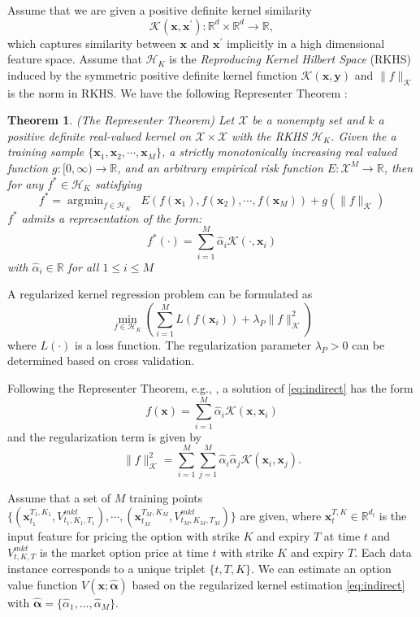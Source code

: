\documentclass[letterpaper,12pt,titlepage,oneside,final]{book}
\numberwithin{equation}{section}
\newtheorem{thm}{Theorem}[section]
\theoremstyle{definition}
\newcommand{\vx}{\mathbf{x}}
\newcommand{\HK}{\mathcal{H}_K}
\newcommand{\XS}{\mathcal{X}}
\newcommand{\Real}{\mathbb{R}}
\DeclareMathOperator*{\argmin}{\arg\!\min}
\newcommand{\valpha}{\pmb{\widehat{\alpha}}}
\begin{document}
Assume that we are given a positive definite kernel similarity
 $$
 \mathcal{K}(\vx, \vx^\prime) : \Real^{d} \times \Real^{d} \rightarrow  \Real,
 $$
 which captures  similarity between $\vx$ and $\vx^\prime$ implicitly in a high dimensional feature space.
 Assume that $\HK$ is the  \emph{Reproducing Kernel Hilbert Space} (RKHS) induced by the symmetric positive definite kernel function $ \mathcal{K}(\mathbf{x},\mathbf{y})$ and $\|f\|_{ \mathcal{K}}$ is the norm in RKHS.
 We have the following Representer Theorem \citep{wahba1990spline}:
\begin{thm}\label{pc:representer}
 (The Representer Theorem)
Let $\XS$ be a nonempty set and $k$ a positive definite real-valued kernel on $\XS \times \XS$ with the RKHS $\HK$.  Given the a training sample $
 \{\mathbf{x}_1, \mathbf{x}_2, \cdots, \mathbf{x}_M\} $, a strictly monotonically increasing real valued function $g:[0, \infty) \rightarrow \Real $,  and an arbitrary empirical risk function $E:\XS^M \rightarrow \Real $, then for any $f^* \in \HK$ satisfying
 \[
 f^*=\argmin_{f \in \HK} \;\;E\left(f(\mathbf{x}_1), f(\mathbf{x}_2), \cdots, f(\mathbf{x}_M)\right) + g( \|f\|_{\mathcal{K}})
 \]
 $f^*$ admits a representation of the form:
 \[
 f^*(\cdot)=\sum_{i=1}^M \widehat{\alpha}_i \mathcal{K}(\cdot,\mathbf{x}_i)
 \]
 with $\widehat{\alpha}_i \in \Real$  for all $1 \leq i \leq M$
\end{thm}

A regularized kernel regression problem can be formulated as
\begin{equation}
\min_{f \in \HK}\left(  \sum_{i=1}^M L(f(\vx_i))+\lambda_P \|f\|^2_{\mathcal{K}}\right)
\label{eq:indirect}
\end{equation}
where $L(\cdot)$ is a loss function.
The regularization parameter $\lambda_P>0$  can be determined based on cross validation.

Following the Representer Theorem,  e.g., \citep{wahba1990spline}, a solution of  \eqref{eq:indirect} has the form
\begin{equation}\label{kr1}
f(\mathbf{x})=\sum_{i=1}^M \widehat{\alpha}_i \mathcal{K}(\mathbf{x},\mathbf{x}_i)
\end{equation}
and the regularization term is given by
\begin{equation}\label{kr2}
\|f\|_{\mathcal{K}}^2=\sum_{i=1}^M \sum_{j=1}^M  \widehat{\alpha}_i \widehat{\alpha}_j \mathcal{K}(\mathbf{x}_i,\mathbf{x}_j).
\end{equation}


Assume that a set of $M$ training points $
 \{ (\vx_{t_1}^{T_1,K_1},V^{mkt}_{t_1,K_1,T_1}), \cdots, (\vx_{t_M}^{T_M,K_M},V^{mkt}_{t_M,K_M,T_M})\} $ are given, where
$
\vx_{t}^{T,K}  \in \Real^{d_l}
$ is the input feature for pricing the option with strike $K$ and expiry $T$ at time $t$ and  $V^{mkt}_{t,K,T}$ is the market option price at time $t$ with strike $K$ and expiry $T$.  Each data instance corresponds to a unique triplet $\{t,T,K\}$.
We can estimate an option value function $V(\vx;\mathbf{\valpha})$ based on the regularized kernel estimation \eqref{eq:indirect} with $\valpha=\{\widehat{\alpha}_1,\dots,\widehat{\alpha}_M\}$.
\end{document}
